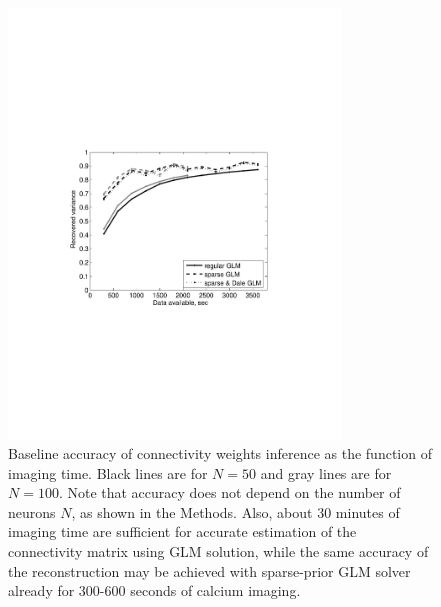 \begin{figure}
\includegraphics[width=250pt]{../figs/Figure4_perf_vs_T}
\caption{Baseline accuracy of connectivity weights inference as the function of imaging time. Black lines are for $N=50$ and gray lines are for $N=100$. Note that accuracy does not depend on the number of neurons $N$, as shown in the Methods. Also, about 30 minutes of imaging time are sufficient for accurate estimation of the connectivity matrix using GLM solution, while the same accuracy of the reconstruction may be achieved with sparse-prior GLM solver already for 300-600 seconds of calcium imaging.}
\label{fig:data-time}
\end{figure}

